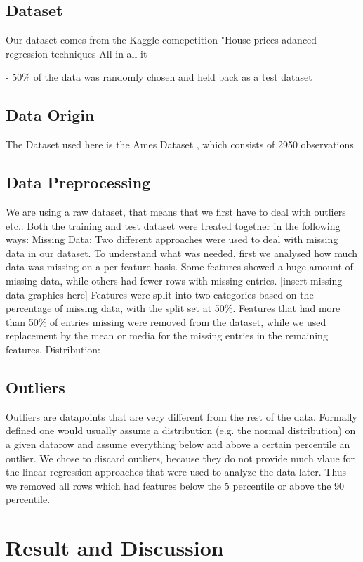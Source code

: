 \documentclass{article}
\begin{document}
\subsection{Dataset} 
Our dataset comes from the Kaggle comepetition "House prices adanced regression techniques \cite{kaggle}
All in all it 

- 50\% of the data was randomly chosen and held back as a test dataset
\subsection{Data Origin}
The Dataset used here is the Ames Dataset \cite{cock_2011}, which consists of 2950 observations 
\subsection{Data Preprocessing}
We are using a raw dataset, that means that we first have to deal with outliers etc.. Both the training and test dataset were treated together in the following ways:
Missing Data:\newline
Two different approaches were used to deal with missing data in our dataset. To understand what was needed, first we analysed how much data was missing on a per-feature-basis. Some features showed a huge amount of missing data, while others had fewer rows with missing entries.
[insert missing data graphics here]
Features were split into two categories based on the percentage of missing data, with the split set at 50\%. Features that had more than 50\% of entries missing were removed from the dataset, while we used replacement by the mean or media for the missing entries in the remaining features.\newline
Distribution:\newline
\subsection{Outliers}
Outliers are datapoints that are very different from the rest of the data. Formally defined one would usually assume a distribution (e.g. the normal distribution) on a given datarow and assume everything below and above a certain percentile an outlier.
 We chose to discard outliers, because they do not provide much vlaue for the linear regression approaches that were used to analyze the data later. Thus we removed all rows which had features below the 5 percentile or above the 90 percentile.\newline
\section{Result and Discussion}
\end{document}
